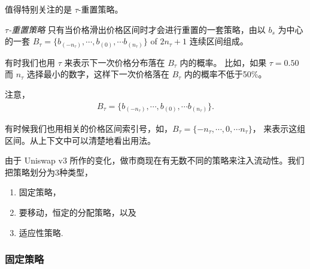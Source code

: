 \documentclass[sigconf, dvipsnames]{acmart}
\newcommand{\dcp}[1]{\textcolor{blue}{{\scriptsize{David:}}#1}}
\begin{document}

%
值得特别关注的是 $\tau$-重置策略。
%
\begin{definition}
{\em $\tau$-重置策略} 只有当价格滑出价格区间时才会进行重置的一套策略，由以 $b_{s}$ 为中心的一套
$B_{\tau} = \{b_{(-n_{\tau})}, \cdots, b_{(0)}, \cdots b_{(n_{\tau})}\}$ of $2 n_{\tau} + 1$
连续区间组成。
\end{definition}

有时我们也用 $\tau$ 来表示下一次价格分布落在 $B_\tau$ 内的概率。
比如，如果 $\tau=0.50$ 而 $n_\tau$ 选择最小的数字，这样下一次价格落在 $B_\tau$ 内的概率不低于50\%。

注意，
\begin{align}
    B_{\tau} = \{b_{(-n_{\tau})}, \cdots, b_{(0)}, \cdots b_{(n_{\tau})}\}.
\end{align}

\fi

有时候我们也用相关的价格区间索引号，如，$B_{\tau} = \{-n_{\tau}, \cdots, 0, \cdots n_{\tau}\}$，
来表示这组区间。从上下文中可以清楚地看出用法。 


由于 Uniswap v3 所作的变化，做市商现在有无数不同的策略来注入流动性。我们把策略划分为3种类型，
\begin{enumerate}
    \item 固定策略，
    \item 要移动，恒定的分配策略，以及
    \item 适应性策略.
\end{enumerate}


\subsubsection{固定策略}
\end{document}
